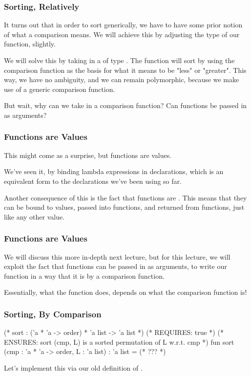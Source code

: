 \documentclass[aspectratio=169]{beamer}
\begin{document}
\begin{frame}[fragile]
  \frametitle{Sorting, Relatively}

  It turns out that in order to sort generically, we have to have some prior notion of
  what a comparison means. We will achieve this by adjusting the type of our 
  function, slightly.

  We will solve this by taking in a  of type .
  The  function will sort by using the comparison function as the basis for what
  it means to be "less" or "greater". This way, we have no ambiguity, and we can remain 
  polymorphic, because we make use of a generic comparison function.

  But wait, why can we take in a comparison function? Can functions be passed in as arguments?
\end{frame}

\begin{frame}[fragile]
  \frametitle{Functions are Values}

  This might come as a surprise, but functions are values.

  We've seen it, by binding lambda expressions in  declarations, which 
  is an equivalent form to the  declarations we've been using so far.

  Another consequence of this is the fact that functions are .
  This means that they can be bound to values, passed into functions, and returned
  from functions, just like any other value. 
\end{frame}

\begin{frame}[fragile]
  \frametitle{Functions are Values}

  We will discuss this more in-depth next lecture, but for this lecture, we will
  exploit the fact that functions can be passed in as arguments, to write our
   function in a way that it is  by a comparison
  function.

  Essentially, what the  function does, depends on what the comparison
  function is!
\end{frame}




\begin{frame}[fragile]
  \frametitle{Sorting, By Comparison}

  \begin{codeblock}
    (* sort : ('a * 'a -> order) * 'a list -> 'a list *)
    (* REQUIRES: true *)
    (* ENSURES: sort (cmp, L) is a sorted permutation of L w.r.t. cmp *)
    fun sort (cmp : 'a * 'a -> order, L : 'a list) : 'a list = (* ??? *)
  \end{codeblock}

  Let's implement this via our old definition of .
\end{frame}
\end{document}
